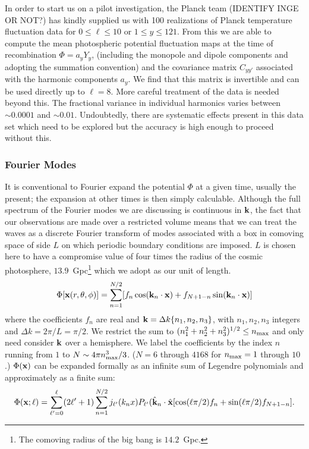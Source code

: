 \documentclass[psfig,11pt]{article}
\begin{document}
In order to start us on a pilot investigation, the Planck team (IDENTIFY INGE OR NOT?) has kindly supplied us with 100 realizations of Planck temperature fluctuation data for $0\le\ell\le10$ or $1\le y\le121$. From this we are able to compute the mean photospheric potential fluctuation maps at the time of recombination $\Phi=a_yY_y$, (including the monopole and dipole components and adopting the summation convention) and the covariance matrix $C_{yy'}$ associated with the harmonic components $a_y$. We find that this matrix is invertible and can be used directly up to $\ell=8$. More careful treatment of the data is needed beyond this. The fractional variance in individual harmonics varies between $\sim0.0001$ and $\sim0.01$. Undoubtedly, there are systematic effects present in this data set which need to be explored but the accuracy is high enough to proceed without this.

\subsubsection{Fourier Modes}
It is conventional to Fourier expand the potential $\Phi$ at a given time, usually the present; the expansion at other times is then simply calculable. Although the full spectrum of the Fourier modes we are discussing is continuous in ${\bf k}$, the fact that our observations are made over a restricted volume means that we can treat the waves as a discrete Fourier transform of modes associated with a box in comoving space of side $L$ on which periodic boundary conditions are imposed. $L$ is chosen here to have a compromise value of four times the radius of the cosmic photosphere, $13.9$~Gpc\footnote{The comoving radius of the big bang is $14.2$~Gpc.} which we adopt as our unit of length.
\begin{equation}
\Phi[{\bf x}(r,\theta,\phi)]=\sum_{n=1}^{N/2}[f_n\cos({\bf k}_n\cdot{\bf x})+f_{N+1-n}\sin({\bf k}_n\cdot{\bf x})]
\end{equation}
where the coefficients $f_n$ are real and ${\bf k}=\Delta k\{n_1,n_2,n_3\}$, with $n_1,n_2,n_3$ integers and $\Delta k=2\pi/L=\pi/2$.  We restrict the sum to $(n_1^2+n_2^2+n_3^2)^{1/2}\le n_{\rm max}$ and only need consider $\bf k$ over a hemisphere. We label the coefficients by the index $n$ running from $1$ to $N\sim4\pi n_{\rm max}^3/3$. ($N=6$ through $4168$ for $n_{\rm max}=1$ through $10$.) $\Phi({\bf x})$ can be expanded formally as an infinite sum of Legendre polynomials and approximately as a finite sum:
\begin{equation}
\Phi({\bf x;\ell})=\sum_{\ell'=0} ^\ell(2\ell'+1)\sum_{n=1}^{N/2}j_{\ell'}(k_nx)P_{\ell'}({\hat{\bf k}}_n\cdot{\hat{\bf x}}[\cos(\ell\pi/2)f_n+\sin(\ell\pi/2)f_{N+1-n}].
\end{equation}
\end{document}
